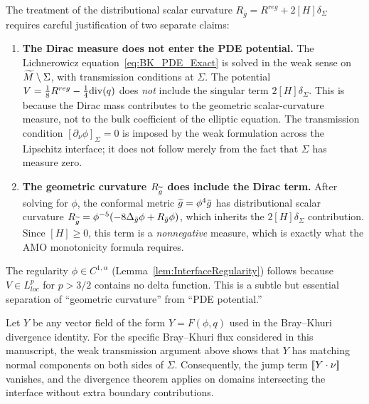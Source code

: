 \begin{remark}\label{rem:VerificationDistCurvature}
The treatment of the distributional scalar curvature $R_{\bar{g}} = R^{reg} + 2[H]\delta_\Sigma$ requires careful justification of two separate claims:

\begin{enumerate}
    \item \textbf{The Dirac measure does not enter the PDE potential.} The Lichnerowicz equation~\eqref{eq:BK_PDE_Exact} is solved in the weak sense on $\widetilde{M} \setminus \Sigma$, with transmission conditions at $\Sigma$. The potential $V = \frac{1}{8}R^{reg} - \frac{1}{4}\mathrm{div}(q)$ does \emph{not} include the singular term $2[H]\delta_\Sigma$. This is because the Dirac mass contributes to the geometric scalar-curvature measure, not to the bulk coefficient of the elliptic equation. The transmission condition $[\partial_\nu \phi]_\Sigma = 0$ is imposed by the weak formulation across the Lipschitz interface; it does not follow merely from the fact that $\Sigma$ has measure zero.
    
    \item \textbf{The geometric curvature $R_{\widetilde{g}}$ does include the Dirac term.} After solving for $\phi$, the conformal metric $\widetilde{g} = \phi^4 \bar{g}$ has distributional scalar curvature $R_{\widetilde{g}} = \phi^{-5}(-8\Delta_{\bar{g}}\phi + R_{\bar{g}}\phi)$, which inherits the $2[H]\delta_\Sigma$ contribution. Since $[H] \ge 0$, this term is a \emph{nonnegative} measure, which is exactly what the AMO monotonicity formula requires.
\end{enumerate}

The regularity $\phi \in C^{1,\alpha}$ (Lemma~\ref{lem:InterfaceRegularity}) follows because $V \in L^p_{loc}$ for $p > 3/2$ contains no delta function. This is a subtle but essential separation of ``geometric curvature'' from ``PDE potential.''
\end{remark}

\begin{corollary}\label{cor:FluxMatching}
Let $Y$ be any vector field of the form $Y=F(\phi,q)$ used in the Bray--Khuri divergence identity. For the specific Bray--Khuri flux considered in this manuscript, the weak transmission argument above shows that $Y$ has matching normal components on both sides of $\Sigma$.
Consequently, the jump term $[\![ Y\cdot \nu ]\!]$ vanishes, and the divergence theorem applies on domains intersecting the interface without extra boundary contributions.
\end{corollary}

